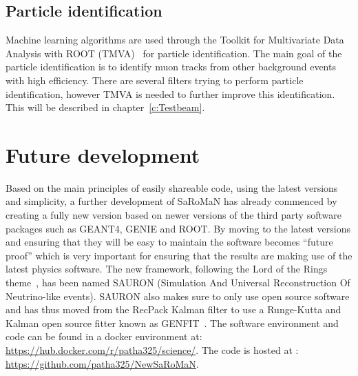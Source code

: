 

\subsection{Particle identification}
Machine learning algorithms are used through the Toolkit for Multivariate Data Analysis with ROOT (TMVA)~\cite{TMVA} for particle identification. The main goal of the particle identification is to identify muon tracks from other background events with high efficiency. There are several filters trying to perform particle identification, however TMVA is needed to further improve this identification. This will be described in chapter~\ref{c:Testbeam}.



\pagebreak
\section{Future development}
Based on the main principles of easily shareable code, using the latest versions and simplicity, a further development of SaRoMaN has already commenced by creating a fully new version based on newer versions of the third party software packages such as GEANT4, GENIE and ROOT. By moving to the latest versions and ensuring that they will be easy to maintain the software becomes ``future proof'' which is very important for ensuring that the results are making use of the latest physics software. The new framework, following the Lord of the Rings theme~\cite{79tolkien2012lord}, has been named SAURON (Simulation And Universal Reconstruction Of Neutrino-like events). SAURON also makes sure to only use open source software and has thus moved from the RecPack Kalman filter to use a Runge-Kutta and Kalman open source fitter known as GENFIT~\cite{81Genfit}.
The software environment and code can be found in a docker environment at: \url{https://hub.docker.com/r/patha325/science/}. The code is hosted at : \url{https://github.com/patha325/NewSaRoMaN}.

